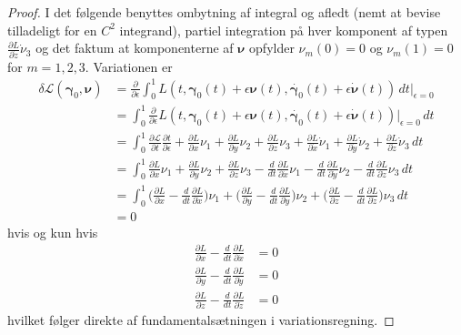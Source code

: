 \begin{proof} I det følgende benyttes ombytning af integral og afledt (nemt at bevise tilladeligt for en $C^2$ integrand), partiel integration på hver komponent af typen $\frac{\partial L}{\partial \dot{z}} \dot{\nu}_3$ og det faktum at komponenterne af $ {\boldsymbol \nu}$ opfylder $\nu_m(0)=0$ og $\nu_m(1)=0$ for $m=1,2,3$. Variationen er
\begin{align*}
\delta \mathscr{L}({\boldsymbol \gamma}_0, {\boldsymbol \nu}) &= \frac{\partial}{\partial \epsilon} \int_0^1 L(t, {\boldsymbol \gamma}_0(t)+\epsilon {\boldsymbol \nu}(t),\dot{{\boldsymbol \gamma}_0}(t)+\epsilon \dot{{\boldsymbol \nu}}(t)) \, dt \Big|_{\epsilon = 0} \\
&=
\int_0^1\frac{\partial}{\partial \epsilon} L(t, {\boldsymbol \gamma}_0(t)+\epsilon {\boldsymbol \nu}(t),\dot{{\boldsymbol \gamma}_0}(t)+\epsilon \dot{{\boldsymbol \nu}}(t))\Big|_{\epsilon = 0} \, dt \\
&=
\int_0^1 \frac{\partial  \mathcal{L}}{\partial t} \frac{\partial t}{\partial \epsilon} + \frac{\partial L}{\partial x} \nu_1 + \frac{\partial L}{\partial y} \nu_2 + \frac{\partial L}{\partial z} \nu_3 + \frac{\partial L}{\partial \dot{x}} \dot{\nu}_1 + \frac{\partial L}{\partial \dot{y}} \dot{\nu}_2 + \frac{\partial L}{\partial \dot{z}} \dot{\nu}_3 \, dt \\
&=
\int_0^1  \frac{\partial L}{\partial x} \nu_1 + \frac{\partial L}{\partial y} \nu_2 + \frac{\partial L}{\partial z} \nu_3 -\frac{d}{dt}\frac{\partial L}{\partial \dot{x}} \nu_1 -\frac{d}{dt} \frac{\partial L}{\partial \dot{y}} \nu_2 -\frac{d}{dt} \frac{\partial L}{\partial \dot{z}} \nu_3 \, dt \\
&=
\int_0^1 \Big( \frac{\partial L}{\partial x} -\frac{d}{dt}\frac{\partial L}{\partial \dot{x}} \Big) \nu_1  + \Big( \frac{\partial L}{\partial y} -\frac{d}{dt} \frac{\partial L}{\partial \dot{y}} \Big) \nu_2  +
\Big( \frac{\partial L}{\partial z} -\frac{d}{dt} \frac{\partial L}{\partial \dot{z}} \Big) \nu_3 \, dt \\
&=0
\end{align*}
hvis og kun hvis 
\begin{align*}
\frac{\partial L}{\partial x} -\frac{d}{dt}\frac{\partial L}{\partial \dot{x}} &= 0 \\
\frac{\partial L}{\partial y} -\frac{d}{dt} \frac{\partial L}{\partial \dot{y}} &=0 \\
\frac{\partial L}{\partial z} -\frac{d}{dt} \frac{\partial L}{\partial \dot{z}} &=0
\end{align*}
hvilket følger direkte af fundamentalsætningen i variationsregning.
\end{proof}


